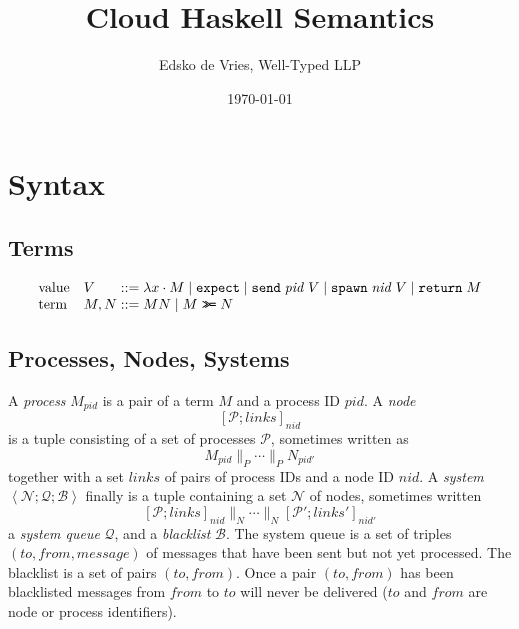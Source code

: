\documentclass{article}
\newcommand{\sLam}[2]{\lambda {#1} \cdot {#2}}
\newcommand{\sApp}[2]{{#1} {#2}}
\newcommand{\sBind}[2]{{#1} \mathrel{\texttt{>}\!\!\texttt{>}\!\texttt{=}} {#2}}
\newcommand{\sReturn}{\mathtt{return}}
\newcommand{\sExpect}{\mathtt{expect}}
\newcommand{\sSend}{\mathtt{send}}
\newcommand{\sSpawn}{\mathtt{spawn}}
\newcommand{\sParP}{\mathrel{{\parallel}_P}}
\newcommand{\sParN}{\mathrel{{\parallel}_N}}
\newcommand{\sProc}[2]{{#1}_{#2}}
\newcommand{\sPid}{\ensuremath{\mathit{pid}}}
\newcommand{\sNid}{\ensuremath{\mathit{nid}}}
\newcommand{\sLinks}{\ensuremath{\mathit{links}}}
\newcommand{\sNode}[3]{\left[{#1} ; {#2}\right]_{#3}}
\newcommand{\sSystem}[3]{\left\langle #1 ; #2 ; #3 \right\rangle}
\newcommand{\sNodes}{\mathcal{N}}
\newcommand{\sQueue}{\mathcal{Q}}
\newcommand{\sProcesses}{\mathcal{P}}
\newcommand{\sBlacklist}{\mathcal{B}}
\newcommand{\OR}{\mathrel{|}}
\begin{document}
\title{Cloud Haskell Semantics}
\author{Edsko de Vries, Well-Typed LLP}
\date{\today}

\maketitle

\section{Syntax}

\subsection{Terms}

\begin{equation*}
\begin{array}{ll@{\;::=\;}l}
\text{value} & V    & \sLam{x}{M} \OR
                      \sExpect \OR
                      \sSend \; \sPid \; V \OR
                      \sSpawn \; \sNid \; V \OR 
                      \sReturn \; M
\\
\text{term}  & M, N & \sApp{M}{N} \OR
                      \sBind{M}{N}
\end{array}
\end{equation*}

\subsection{Processes, Nodes, Systems}

A \emph{process} $\sProc{M}{\sPid}$ is a pair of a term $M$ and a process ID $\sPid$.
A \emph{node}
  $$\sNode{\sProcesses}
          {\sLinks}
          {\sNid}$$
is a tuple consisting of a set of
processes $\sProcesses$, sometimes written as
  $$\sProc{M}{\sPid} \sParP \cdots \sParP \sProc{N}{\sPid'}$$
together with a set \sLinks{} of pairs of process IDs and a node ID \sNid. 
A \emph{system} 
  $\sSystem{\sNodes}{\sQueue}{\sBlacklist}$ 
finally is a tuple containing a set $\sNodes$ of nodes, sometimes written
  $$\sNode{\sProcesses}{\sLinks}{\sNid} 
    \sParN
       \cdots
    \sParN
    \sNode{\sProcesses'}{\sLinks'}{\sNid'}
  $$
a \emph{system queue} $\sQueue$, and a \emph{blacklist} $\sBlacklist$. The
system queue is a set of triples $(\mathit{to}, \mathit{from},
\mathit{message})$ of messages that have been sent but not yet processed. The
blacklist is a set of pairs $(\mathit{to}, \mathit{from})$. Once a pair
$(\mathit{to}, \mathit{from})$ has been blacklisted messages from
$\mathit{from}$ to $\mathit{to}$ will never be delivered ($\mathit{to}$ and
$\mathit{from}$ are node or process identifiers). 
\end{document}
